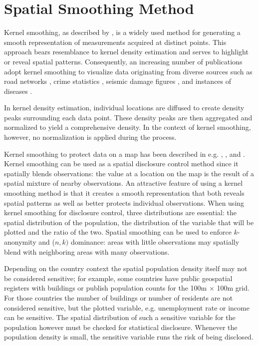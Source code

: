 \section{Spatial Smoothing Method} \label{sec:methods_smooth}

Kernel smoothing, as described by \citep{Wand1994}, is a widely used method for
generating a smooth representation of measurements acquired at distinct points.
This approach bears resemblance to kernel density estimation
\citep{Silverman1986} and serves to highlight or reveal spatial patterns.
Consequently, an increasing number of publications adopt kernel smoothing to
visualize data originating from diverse sources such as road networks
\citep{Borruso2003}, crime statistics \citep{Chainey2002}, seismic damage
figures \citep{Danese2008}, and instances of diseases \citep{Davies2010}. 

In kernel density estimation, individual locations are diffused to create
density peaks surrounding each data point. These density peaks are then
aggregated and normalized to yield a comprehensive density. In the context of
kernel smoothing, however, no normalization is applied during the process. 

Kernel smoothing to protect data on a map has been described in e.g. \citet{JongeWolf2016}, \citet{DeWolfDeJonge2017}, \citet{WolfJonge2018} and \citet{Hut2020Thesis}. Kernel smoothing can be used as a spatial disclosure control method since it spatially blends observations: the value 
at a location on the map is the result of a spatial mixture of nearby observations. An attractive feature of using a kernel smoothing method is that it creates a smooth representation that both reveals spatial patterns as well as better protects individual observations. When using kernel smoothing for disclosure control, three distributions are essential: 
the spatial distribution of the population, the distribution of the variable that will be plotted and the ratio of the two. 
Spatial smoothing can be used to enforce $k$-anonymity and  ($n,k)$ dominance: areas with little observations may spatially blend with neighboring areas with many observations. 


Depending on the country context the spatial population density itself may not be considered sensitive; 
for example, some countries have public geospatial registers with buildings or publish 
population counts for the 100m $\times$ 100m grid. For those
countries the number of buildings or number of residents are 
not considered sensitive, but the plotted variable, e.g. unemployment rate or income can be sensitive.
The spatial distribution of such a sensitive 
variable for the population however must be checked for statistical disclosure. 
Whenever the population density is small, the sensitive variable runs the risk of 
being disclosed.

